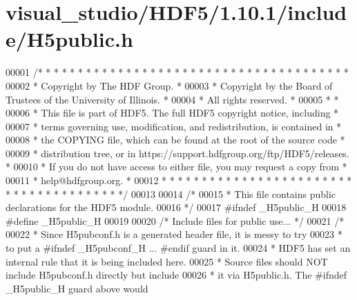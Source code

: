 \hypertarget{visual__studio_2_h_d_f5_21_810_81_2include_2_h5public_8h_source}{}\section{visual\+\_\+studio/\+H\+D\+F5/1.10.1/include/\+H5public.h}
\label{visual__studio_2_h_d_f5_21_810_81_2include_2_h5public_8h_source}

\begin{DoxyCode}
00001 \textcolor{comment}{/* * * * * * * * * * * * * * * * * * * * * * * * * * * * * * * * * * * * * * *}
00002 \textcolor{comment}{ * Copyright by The HDF Group.                                               *}
00003 \textcolor{comment}{ * Copyright by the Board of Trustees of the University of Illinois.         *}
00004 \textcolor{comment}{ * All rights reserved.                                                      *}
00005 \textcolor{comment}{ *                                                                           *}
00006 \textcolor{comment}{ * This file is part of HDF5.  The full HDF5 copyright notice, including     *}
00007 \textcolor{comment}{ * terms governing use, modification, and redistribution, is contained in    *}
00008 \textcolor{comment}{ * the COPYING file, which can be found at the root of the source code       *}
00009 \textcolor{comment}{ * distribution tree, or in https://support.hdfgroup.org/ftp/HDF5/releases.  *}
00010 \textcolor{comment}{ * If you do not have access to either file, you may request a copy from     *}
00011 \textcolor{comment}{ * help@hdfgroup.org.                                                        *}
00012 \textcolor{comment}{ * * * * * * * * * * * * * * * * * * * * * * * * * * * * * * * * * * * * * * */}
00013 
00014 \textcolor{comment}{/*}
00015 \textcolor{comment}{ * This file contains public declarations for the HDF5 module.}
00016 \textcolor{comment}{ */}
00017 \textcolor{preprocessor}{#ifndef \_H5public\_H}
00018 \textcolor{preprocessor}{#define \_H5public\_H}
00019 
00020 \textcolor{comment}{/* Include files for public use... */}
00021 \textcolor{comment}{/*}
00022 \textcolor{comment}{ * Since H5pubconf.h is a generated header file, it is messy to try}
00023 \textcolor{comment}{ * to put a #ifndef \_H5pubconf\_H ... #endif guard in it.}
00024 \textcolor{comment}{ * HDF5 has set an internal rule that it is being included here.}
00025 \textcolor{comment}{ * Source files should NOT include H5pubconf.h directly but include}
00026 \textcolor{comment}{ * it via H5public.h.  The #ifndef \_H5public\_H guard above would}

\end{DoxyCode}
